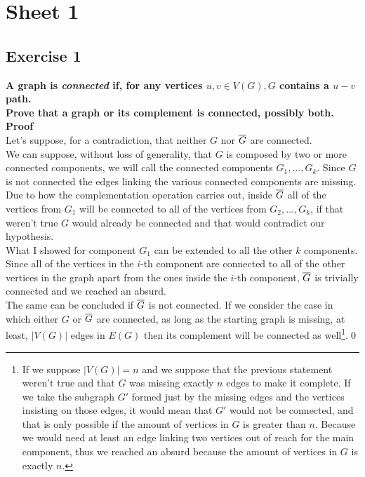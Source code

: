 \section*{Sheet 1}
\subsection*{Exercise 1}
\boldmath
\textbf{A graph is \textit{connected} if, for any vertices $u, v \in V(G), G$ contains a $u - v$ path.\\
Prove that a graph or its complement is connected, possibly both.\\
\linebreak
Proof\\}
\unboldmath
Let's suppose, for a contradiction, that neither $G$ nor $\overline{G}$ are connected.\\
\linebreak
We can suppose, without loss of generality, that $G$ is composed by two or more connected components, we will call the connected components $G_1, \dots, G_k$. Since $G$ is not connected the edges linking the various connected components are missing.\\
Due to how the complementation operation carries out, inside $\overline{G}$ all of the vertices from $G_1$ will be connected to all of the vertices from $G_2, \dots, G_k$, if that weren't true $G$ would already be connected and that would contradict our hypothesis.\\
What I showed for component $G_1$ can be extended to all the other $k$ components.\\
\linebreak
Since all of the vertices in the $i$-th component are connected to all of the other vertices in the graph apart from the ones inside the $i$-th component, $\overline{G}$ is trivially connected and we reached an absurd.\\
\linebreak
The same can be concluded if $\overline{G}$ is not connected. If we consider the case in which either $G$ or $\overline{G}$ are connected, as long as the starting graph is missing, at least, $|V(G)|$ edges in $E(G)$ then its complement will be connected as well\footnote{If we suppose $|V(G)| = n$ and we suppose that the previous statement weren't true and that $G$ was missing exactly $n$ edges to make it complete. If we take the subgraph $G'$ formed just by the missing edges and the vertices insisting on those edges, it would mean that $G'$ would not be connected, and that is only possible if the amount of vertices in $G$ is greater than $n$. Because we would need at least an edge linking two vertices out of reach for the main component, thus we reached an absurd because the amount of vertices in $G$ is exactly $n$.}.\qed